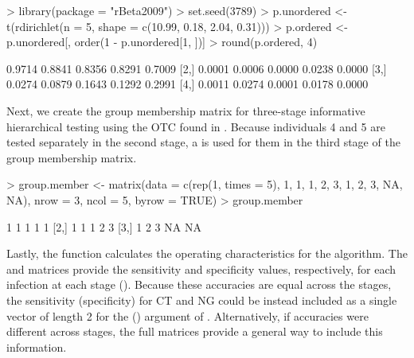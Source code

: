 \begin{Schunk}
\begin{Sinput}
> library(package = "rBeta2009")
> set.seed(3789)
> p.unordered <- t(rdirichlet(n = 5, shape = c(10.99, 0.18, 2.04, 0.31)))
> p.ordered <- p.unordered[, order(1 - p.unordered[1, ])]
> round(p.ordered, 4)
\end{Sinput}
\begin{Soutput}
       [,1]   [,2]   [,3]   [,4]   [,5]
[1,] 0.9714 0.8841 0.8356 0.8291 0.7009
[2,] 0.0001 0.0006 0.0000 0.0238 0.0000
[3,] 0.0274 0.0879 0.1643 0.1292 0.2991
[4,] 0.0011 0.0274 0.0001 0.0178 0.0000
\end{Soutput}
\end{Schunk}

Next, we create the group membership matrix for three-stage informative
hierarchical testing using the OTC found in \citet{bilder2019informative}.
Because individuals 4 and 5 are tested separately in the second stage,
a  is used for them in the third stage of the group membership
matrix.

\begin{Schunk}
\begin{Sinput}
> group.member <- matrix(data = c(rep(1, times = 5), 1, 1, 1, 2, 3, 1, 2,
     3, NA, NA), nrow = 3, ncol = 5, byrow = TRUE)
> group.member
\end{Sinput}
\begin{Soutput}
     [,1] [,2] [,3] [,4] [,5]
[1,]    1    1    1    1    1
[2,]    1    1    1    2    3
[3,]    1    2    3   NA   NA
\end{Soutput}
\end{Schunk}

Lastly, the  function calculates the operating characteristics
for the algorithm. The  and  matrices provide
the sensitivity and specificity values, respectively, for each infection
at each stage (\citealt{IowaComm}). Because these accuracies are
equal across the stages, the sensitivity (specificity) for CT and
NG could be instead included as a single vector of length 2 for the
 () argument of . Alternatively,
if accuracies were different across stages, the full matrices provide
a general way to include this information.

